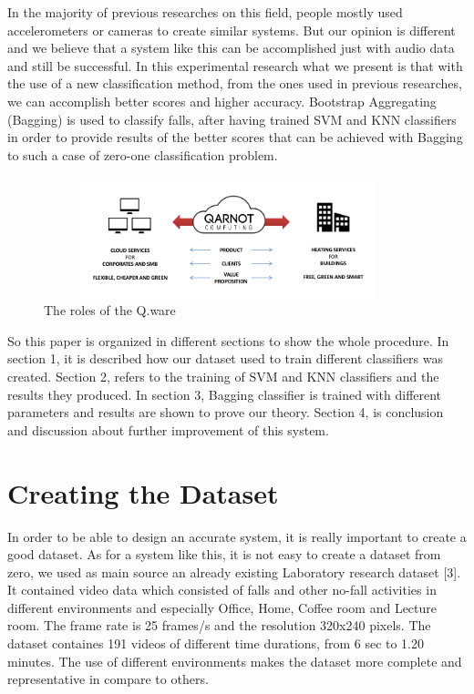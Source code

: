 \documentclass{article}
\begin{document}
In the majority of previous researches on this field, people mostly used accelerometers or cameras to create similar systems. But our opinion is different and we believe that a system like this can be accomplished just with audio data and still be successful. In this experimental research what we present is that with the use of a new classification method, from the ones used in previous researches, we can accomplish better scores and higher accuracy. Bootstrap Aggregating (Bagging) is used to classify falls, after having trained SVM and KNN classifiers in order to provide results of the better scores that can be achieved with Bagging to such a case of zero-one classification problem.

\begin{figure}[t]
\begin{center}
\includegraphics[width=10.7cm,height=3.5cm]{./Figures/model.png}
\caption{\scriptsize The roles of the Q.ware }
\end{center}
\end{figure} 

So this paper is organized in different sections to show the whole procedure. In section 1, it is described how our dataset used to train different classifiers was created. Section 2, refers to the training of SVM and KNN classifiers and the results they produced. In section 3, Bagging classifier is trained with different parameters and results are shown to prove our theory. Section 4, is conclusion and discussion about further improvement of this system.

\section{Creating the Dataset} 
 
In order to be able to design an accurate system, it is really important to create a good dataset. As for a system like this, it is not easy to create a dataset from zero, we used as main source an already existing Laboratory research dataset [3]. It contained video data which consisted of falls and other no-fall activities in different environments and especially Office, Home, Coffee room and Lecture room. The frame rate is 25 frames/s and the resolution 320x240 pixels. The dataset containes 191 videos of different time durations, from 6 sec to 1.20 minutes. The use of different environments makes the dataset more complete and representative in compare to others.  
\end{document}
